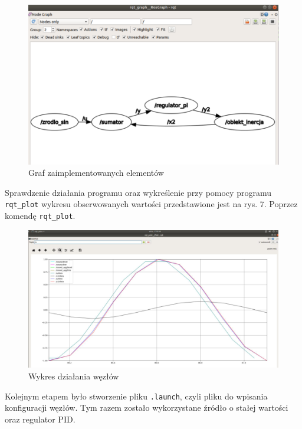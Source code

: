 \documentclass[10pt,a4paper,twoside,twocolumn]{article}%
\begin{document}
\begin{figure}[H]
    \centering
    \includegraphics[width=0.9\linewidth]{image6.png}
    \caption{Graf zaimplementowanych elementów}
\end{figure}

Sprawdzenie działania programu oraz wykreślenie przy pomocy programu \texttt{rqt\_plot} wykresu obserwowanych wartości przedstawione jest na rys. 7. Poprzez komendę \texttt{rqt\_plot}.

\begin{figure}[H]
    \centering
    \includegraphics[width=1\linewidth]{image7.png}
    \caption{Wykres działania węzłów}
\end{figure}

Kolejnym etapem było stworzenie pliku \texttt{.launch}, czyli pliku do wpisania konfiguracji węzłów. Tym razem zostało wykorzystane źródło o stałej wartości oraz regulator PID.
\end{document}

